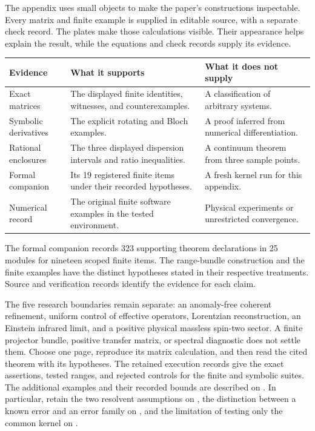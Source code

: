The appendix uses small objects to make the paper's constructions inspectable. Every matrix and finite example is supplied in editable source, with a separate check record. The plates make those calculations visible. Their appearance helps explain the result, while the equations and check records supply its evidence.
\par\vspace{4pt}
\begin{tabularx}{\linewidth}{@{}p{.24\linewidth}YY@{}}
\toprule
Evidence & What it supports & What it does not supply\\\midrule
Exact matrices & The displayed finite identities, witnesses, and counterexamples. & A classification of arbitrary systems.\\
Symbolic derivatives & The explicit rotating and Bloch examples. & A proof inferred from numerical differentiation.\\
Rational enclosures & The three displayed dispersion intervals and ratio inequalities. & A continuum theorem from three sample points.\\
Formal companion & Its 19 registered finite items under their recorded hypotheses. & A fresh kernel run for this appendix.\\
Numerical record & The original finite software examples in the tested environment. & Physical experiments or unrestricted convergence.\\\bottomrule
\end{tabularx}
The formal companion records 323 supporting theorem declarations in 25 modules for nineteen scoped finite items. The range-bundle construction and the finite examples have the distinct hypotheses stated in their respective treatments. Source and verification records identify the evidence for each claim.

The five research boundaries remain separate: an anomaly-free coherent refinement, uniform control of effective operators, Lorentzian reconstruction, an Einstein infrared limit, and a positive physical massless spin-two sector. A finite projector bundle, positive transfer matrix, or spectral diagnostic does not settle them.
Choose one page, reproduce its matrix calculation, and then read the cited theorem with its hypotheses. The retained execution records give the exact assertions, tested ranges, and rejected controls for the finite and symbolic suites. The additional examples and their recorded bounds are described on . In particular, retain the two resolvent assumptions on , the distinction between a known error and an error family on , and the limitation of testing only the common kernel on .
